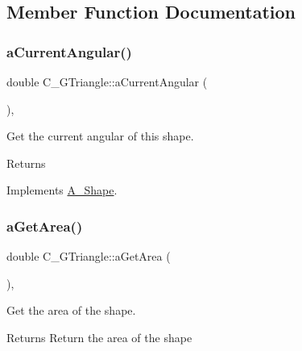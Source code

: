 \subsection{Member Function Documentation}
\mbox{\label{classC__GTriangle_a98866648972bb78707c61aa7ebc22fb9}} 
\subsubsection{\texorpdfstring{a\+Current\+Angular()}{aCurrentAngular()}}
{\footnotesize\ttfamily double C\+\_\+\+G\+Triangle\+::a\+Current\+Angular (\begin{DoxyParamCaption}{ }\end{DoxyParamCaption})\hspace{0.3cm}{\ttfamily [override]}, {\ttfamily [virtual]}}



Get the current angular of this shape. 

\begin{DoxyReturn}{Returns}

\end{DoxyReturn}


Implements \hyperlink{classA__Shape_a80fa4e009c875dd0ba7fc5bfeeb43f98}{A\+\_\+\+Shape}.

\mbox{\label{classC__GTriangle_a4d1c9a050aef86a7eab973b1fe668544}} 
\subsubsection{\texorpdfstring{a\+Get\+Area()}{aGetArea()}}
{\footnotesize\ttfamily double C\+\_\+\+G\+Triangle\+::a\+Get\+Area (\begin{DoxyParamCaption}{ }\end{DoxyParamCaption})\hspace{0.3cm}{\ttfamily [override]}, {\ttfamily [virtual]}}



Get the area of the shape. 

\begin{DoxyReturn}{Returns}
Return the area of the shape 
\end{DoxyReturn}


